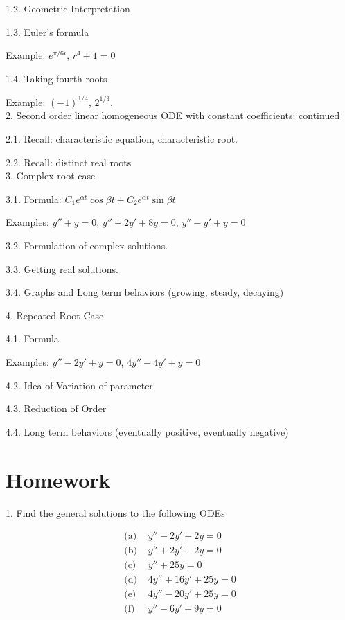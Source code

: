 \documentclass[11pt]{article}
\begin{document}
1.2. Geometric Interpretation

1.3. Euler's formula

Example: $e^{\pi/6 i}$, $r^4 + 1 = 0$

1.4. Taking fourth roots

Example: $(-1)^{1/4}$, $2^{1/3}$. \\


2. Second order linear homogeneous ODE with constant coefficients: continued

2.1. Recall: characteristic equation, characteristic root. 

2.2. Recall: distinct real roots \\

3. Complex root case

3.1. Formula: $C_1 e^{\alpha t}\cos \beta t + C_2 e^{\alpha t}\sin \beta t$

Examples: $y'' + y = 0$, $y'' + 2y' + 8y = 0$, $y'' - y' + y = 0$

3.2. Formulation of complex solutions.

3.3. Getting real solutions. 

3.4. Graphs and Long term behaviors (growing, steady, decaying)

4. Repeated Root Case

4.1. Formula 

Examples: $y'' - 2y' + y = 0$, $4y'' - 4y' + y = 0$

4.2. Idea of Variation of parameter

4.3. Reduction of Order

4.4. Long term behaviors (eventually positive, eventually negative)

\newpage

\section*{Homework}

1. Find the general solutions to the following ODEs

$$\begin{aligned}
\text{(a)  }& y'' - 2y' + 2y = 0\\
\text{(b)  }& y'' + 2y' + 2y = 0\\
\text{(c)  }& y'' + 25 y = 0\\
\text{(d)  }& 4y'' + 16 y' + 25y = 0\\
\text{(e)  }& 4y'' - 20 y' + 25y = 0\\
\text{(f)  }& y'' - 6y' + 9y = 0\\
\end{aligned}$$
\end{document}
